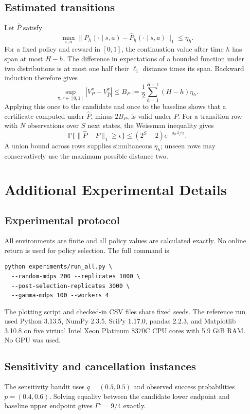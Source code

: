 \documentclass[letterpaper]{article}
\newcommand{\Prb}{\mathbb{P}}
\begin{document}
\subsection{Estimated transitions}
Let $\widehat P$ satisfy
\[
\max_{s,a}\|P_h(\cdot\mid s,a)-\widehat P_h(\cdot\mid s,a)\|_1\leq\eta_h.
\]
For a fixed policy and reward in $[0,1]$, the continuation value after time $h$ has span at most $H-h$. The difference in expectations of a bounded function under two distributions is at most one half their $\ell_1$ distance times its span. Backward induction therefore gives
\[
\sup_{\pi,r\in[0,1]}|V_P^\pi-V_{\widehat P}^\pi|
\leq B_P:=\frac12\sum_{h=1}^{H-1}(H-h)\eta_h.
\]
Applying this once to the candidate and once to the baseline shows that a certificate computed under $\widehat P$, minus $2B_P$, is valid under $P$. For a transition row with $N$ observations over $S$ next states, the Weissman inequality gives
\[
\Prb\{\|\widehat P-P\|_1\geq\epsilon\}
\leq(2^S-2)e^{-N\epsilon^2/2}.
\]
A union bound across rows supplies simultaneous $\eta_h$; unseen rows may conservatively use the maximum possible distance two.

\section{Additional Experimental Details}
\subsection{Experimental protocol}
All environments are finite and all policy values are calculated exactly. No online return is used for policy selection. The full command is
\begin{verbatim}
python experiments/run_all.py \
  --random-mdps 200 --replicates 1000 \
  --post-selection-replicates 3000 \
  --gamma-mdps 100 --workers 4
\end{verbatim}
The plotting script and checked-in CSV files share fixed seeds. The reference run used Python 3.13.5, NumPy 2.3.5, SciPy 1.17.0, pandas 2.2.3, and Matplotlib 3.10.8 on five virtual Intel Xeon Platinum 8370C CPU cores with 5.9 GiB RAM. No GPU was used.

\subsection{Sensitivity and cancellation instances}
The sensitivity bandit uses $q=(0.5,0.5)$ and observed success probabilities $p=(0.4,0.6)$. Solving equality between the candidate lower endpoint and baseline upper endpoint gives $\Gamma^\star=9/4$ exactly.
\end{document}
